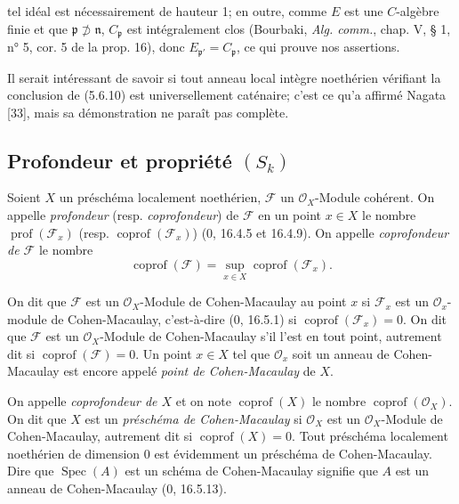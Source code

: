 \begin{example}[5.6.11]

tel idéal est nécessairement de hauteur 1; en outre, comme $E$ est une
$C$-algèbre finie et que $\mathfrak p\not\supset\mathfrak n$,
$C_{\mathfrak p}$ est intégralement clos (Bourbaki, \emph{Alg. comm.},
chap. V, § 1, n° 5, cor. 5 de la prop. 16), donc
$E_{\mathfrak p'}=C_{\mathfrak p}$, ce qui prouve nos assertions.

Il serait intéressant de savoir si tout anneau local intègre noethérien
vérifiant la conclusion de (5.6.10) est universellement caténaire; c'est ce
qu'a affirmé Nagata [33], mais sa démonstration ne paraît pas complète.
\end{example}

\subsection{Profondeur et propriété $(S_k)$}

\begin{definition}[5.7.1]
\label{IV.2.s5.7.1-fr}
Soient $X$ un préschéma localement noethérien, $\mathscr F$ un
$\mathcal O_X$-Module cohérent. On appelle \emph{profondeur} (resp.
\emph{coprofondeur}) de $\mathscr F$ en un point $x\in X$ le nombre
$\operatorname{prof}(\mathscr F_x)$ (resp.
$\operatorname{coprof}(\mathscr F_x)$) (0, 16.4.5 et 16.4.9). On appelle
\emph{coprofondeur de $\mathscr F$} le nombre
\begin{equation}
\operatorname{coprof}(\mathscr F)
=\sup_{x\in X}\operatorname{coprof}(\mathscr F_x).
\tag{5.7.1.1}\label{IV.2.s5.7.1.1-fr}
\end{equation}

On dit que $\mathscr F$ est un $\mathcal O_X$-Module de Cohen-Macaulay au
point $x$ si $\mathscr F_x$ est un $\mathcal O_x$-module de Cohen-Macaulay,
c'est-à-dire (0, 16.5.1) si $\operatorname{coprof}(\mathscr F_x)=0$. On dit
que $\mathscr F$ est un $\mathcal O_X$-Module de Cohen-Macaulay s'il l'est
en tout point, autrement dit si $\operatorname{coprof}(\mathscr F)=0$. Un
point $x\in X$ tel que $\mathcal O_x$ soit un anneau de Cohen-Macaulay est
encore appelé \emph{point de Cohen-Macaulay} de $X$.

On appelle \emph{coprofondeur de $X$} et on note $\operatorname{coprof}(X)$
le nombre $\operatorname{coprof}(\mathcal O_X)$. On dit que $X$ est un
\emph{préschéma de Cohen-Macaulay} si $\mathcal O_X$ est un
$\mathcal O_X$-Module de Cohen-Macaulay, autrement dit si
$\operatorname{coprof}(X)=0$. Tout préschéma localement noethérien de
dimension 0 est évidemment un préschéma de Cohen-Macaulay. Dire que
$\operatorname{Spec}(A)$ est un schéma de Cohen-Macaulay signifie que $A$
est un anneau de Cohen-Macaulay (0, 16.5.13).
\end{definition}

